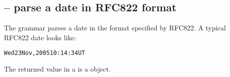 \subsection{ -- parse a date in RFC822 format}
\label{date:rfc822}


The  grammar parses a date in the format specified by RFC822. A typical RFC822 date looks like:
\begin{alltt}
Wed 23 Nov, 2005 10:14:34 UT
\end{alltt}
The returned value in a  is a  object.
